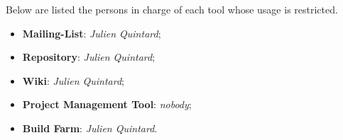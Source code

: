 Below are listed the persons in charge of each tool whose usage is restricted.

\begin{itemize}
  \item
    \textbf{Mailing-List}: \textit{Julien Quintard};
  \item
    \textbf{Repository}: \textit{Julien Quintard};
  \item
    \textbf{Wiki}: \textit{Julien Quintard};
  \item
    \textbf{Project Management Tool}: \textit{nobody};
  \item
    \textbf{Build Farm}: \textit{Julien Quintard}.
\end{itemize}
